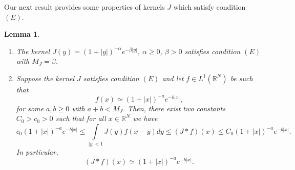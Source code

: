 \documentclass[leqno,12pt]{article}
\newcommand{\intl}{\int\limits}
\newcommand{\R}{\mathbb R}
\newtheorem{lemma}[theorem]{Lemma}
\numberwithin{equation}{section}
\begin{document}
Our next result provides some properties of kernels $J$ which satisfy condition $(E)$. 
\begin{lemma}\label{l1}
\begin{enumerate}
\item[\rm (i)] The kernel $J(y)=(1+|y|)^{-\alpha}e^{-\beta|y|}$, $\alpha\geq 0$, $\beta>0$  satisfies condition $(E)$ with $M_J=\beta$.
\item[\rm (ii)] Suppose the kernel $J$ satisfies condition $(E)$ and let $f\in L^1(\R^N)$ be such that 
$$
f(x)\simeq (1+|x|)^{-a}e^{-b |x|},
$$
for some $a,b\geq 0$ with $a+b<M_J$. Then, there exist two constants $C_0>c_0>0$ such that for all $x\in \R^N$ we have 
\begin{equation}\label{kernimp}
c_0 (1+|x|)^{-a}e^{-b |x|} \leq \intl_{|y|<1}  J(y) f(x-y) dy\leq (J*f)(x)\leq C_0 (1+|x|)^{-a}e^{-b |x|}.
\end{equation}
In particular,
\begin{equation}\label{kernj}
(J * f)(x) \simeq (1+|x|)^{-a}e^{-b |x|}.
\end{equation}
\end{enumerate}
\end{lemma}
\end{document}
